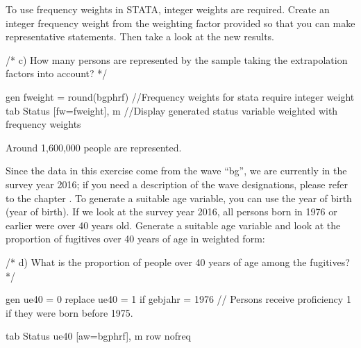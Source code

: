 \documentclass[letterpaper,10pt,openany,onesideH,english]{sphinxmanual}
\begin{document}

To use frequency weights in STATA, integer weights are required. Create an integer frequency weight from the weighting factor provided so that you can make representative statements. Then take a look at the new results.

%
\begin{sphinxVerbatim}[commandchars=\\\{\},numbers=left,firstnumber=1,stepnumber=1]
/*
c)	How many persons are represented by the sample taking the extrapolation factors into account?
*/

gen fweight = round(bgphrf) //Frequency weights for stata require integer weight
tab Status [fw=fweight], m  //Display generated status variable weighted with frequency weights
\end{sphinxVerbatim}

\begin{figure}[H]
\centering

\noindent{}
\end{figure}

Around 1,600,000 people are represented.


Since the data in this exercise come from the wave “bg”, we are currently in the survey year 2016; if you need a description of the wave designations, please refer to the chapter {\hyperref[\detokenize{Principles of Data Structure/index:label}]{}}. To generate a suitable age variable, you can use the year of birth (year of birth). If we look at the survey year 2016, all persons born in 1976 or earlier were over 40 years old. Generate a suitable age variable and look at the proportion of fugitives over 40 years of age in weighted form:

%
\begin{sphinxVerbatim}[commandchars=\\\{\},numbers=left,firstnumber=1,stepnumber=1]
/*
d)	What is the proportion of people over 40 years of age among the fugitives?
*/

gen ue\PYGZus{}40 = 0
replace ue\PYGZus{}40 = 1 if gebjahr \PYGZlt{}= 1976 // Persons receive proficiency 1 if they were born before 1975.

tab Status ue\PYGZus{}40 [aw=bgphrf], m row nofreq
\end{sphinxVerbatim}
\end{document}
